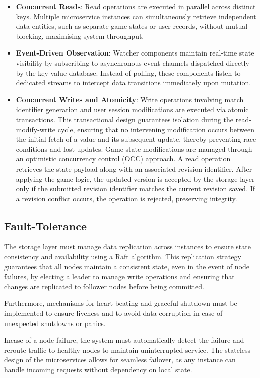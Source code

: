 \documentclass{scrartcl}
\begin{document}
\begin{itemize}
    \item \textbf{Concurrent Reads}: Read operations are executed in parallel across distinct keys. Multiple microservice instances can simultaneously retrieve independent data entities, such as separate game states or user records, without mutual blocking, maximising system throughput.
    \item \textbf{Event-Driven Observation}: Watcher components maintain real-time state visibility by subscribing to asynchronous event channels dispatched directly by the key-value database. Instead of polling, these components listen to dedicated streams to intercept data transitions immediately upon mutation.
    \item \textbf{Concurrent Writes and Atomicity}: Write operations involving match identifier generation and user session modifications are executed via atomic transactions. This transactional design guarantees isolation during the read-modify-write cycle, ensuring that no intervening modification occurs between the initial fetch of a value and its subsequent update, thereby preventing race conditions and lost updates. Game state modifications are managed through an optimistic concurrency control (OCC) approach. A read operation retrieves the state payload along with an associated revision identifier. After applying the game logic, the updated version is accepted by the storage layer only if the submitted revision identifier matches the current revision saved. If a revision conflict occurs, the operation is rejected, preserving integrity.
\end{itemize}

\subsection{Fault-Tolerance}\label{fault-tolerance}
The storage layer must manage data replication across instances to ensure state consistency and availability using a Raft algorithm. This replication strategy guarantees that all nodes maintain a consistent state, even in the event of node failures, by electing a leader to manage write operations and ensuring that changes are replicated to follower nodes before being committed.

Furthermore, mechanisms for heart-beating and graceful shutdown must be implemented to ensure liveness and to avoid data corruption in case of unexpected shutdowns or panics.

Incase of a node failure, the system must automatically detect the failure and reroute traffic to healthy nodes to maintain uninterrupted service. The stateless design of the microservices allows for seamless failover, as any instance can handle incoming requests without dependency on local state.
\end{document}
